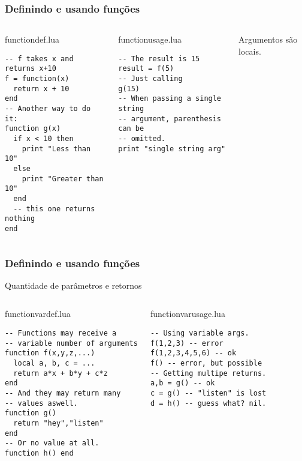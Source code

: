 \documentclass[brazil]{beamer}
\begin{document}
\begin{frame}[fragile]
  \frametitle{Definindo e usando funções}
  \pause
  \begin{columns}
      \begin{block}{functiondef.lua}
        \begin{lstlisting}
-- f takes x and returns x+10
f = function(x)
  return x + 10
end
-- Another way to do it:
function g(x)
  if x < 10 then
    print "Less than 10"
  else
    print "Greater than 10"
  end
  -- this one returns nothing
end
        \end{lstlisting}
      \end{block}
    \pause
      \begin{block}{functionusage.lua}
        \begin{lstlisting}
-- The result is 15
result = f(5)
-- Just calling
g(15)
-- When passing a single string
-- argument, parenthesis can be
-- omitted.
print "single string arg"
        \end{lstlisting}
      \end{block}
      \pause
      Argumentos são locais.
  \end{columns}
\end{frame}
\begin{frame}[fragile]
  \frametitle{Definindo e usando funções}
  \pause
  \begin{center}
    Quantidade de parâmetros e retornos
  \end{center}
  \pause
  \begin{columns}
      \begin{block}{functionvardef.lua}
        \begin{lstlisting}
-- Functions may receive a
-- variable number of arguments
function f(x,y,z,...)
  local a, b, c = ...
  return a*x + b*y + c*z
end
-- And they may return many
-- values aswell.
function g()
  return "hey","listen"
end
-- Or no value at all.
function h() end
        \end{lstlisting}
      \end{block}
    \pause
      \begin{block}{functionvarusage.lua}
        \begin{lstlisting}
-- Using variable args.
f(1,2,3) -- error
f(1,2,3,4,5,6) -- ok
f() -- error, but possible
-- Getting multipe returns.
a,b = g() -- ok
c = g() -- "listen" is lost
d = h() -- guess what? nil.
        \end{lstlisting}
      \end{block}
  \end{columns}
\end{frame}
\end{document}
